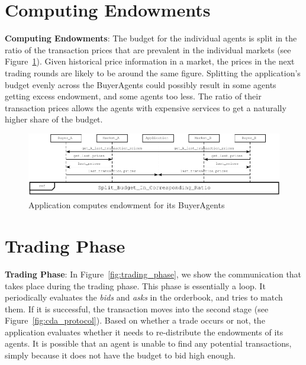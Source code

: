 \documentclass[10pt,journal,compsoc]{IEEEtran}
\begin{document}
\section{Computing Endowments}
\textbf{Computing Endowments}: The budget for the individual agents is split in the ratio of the transaction prices that are prevalent in the individual markets (see Figure~\ref{fig:compute_endowment}). Given historical price information in a market, the prices in the next trading rounds are likely to be around the same figure. Splitting the application's budget evenly across the BuyerAgents could possibly result in some agents getting excess endowment, and some agents too less. The ratio of their transaction prices allows the agents with expensive services to get a naturally higher share of the budget.
\begin{figure}[h]
\centering
\includegraphics[scale=0.7]{drawings/compute_endowment.pdf}
\caption{Application computes endowment for its BuyerAgents \label{fig:compute_endowment}}
\end{figure}

\section{Trading Phase}
\textbf{Trading Phase}: In Figure~\ref{fig:trading_phase}, we show the communication that takes place during the trading phase. This phase is essentially a loop. It periodically evaluates the \textit{bids} and \textit{asks} in the orderbook, and tries to match them. If it is successful, the transaction moves into the second stage (see Figure~\ref{fig:cda_protocol}). Based on whether a trade occurs or not, the application evaluates whether it needs to re-distribute the endowments of its agents. It is possible that an agent is unable to find any potential transactions, simply because it does not have the budget to bid high enough.
\end{document}
